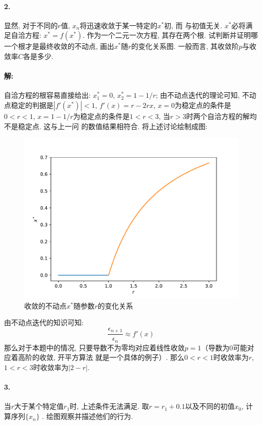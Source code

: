 \documentclass[a4paper,zihao=5,UTF8]{ctexart}
\begin{document}
    \paragraph{2.}显然, 对于不同的$r$值, $x_n$将迅速收敛于某一特定的$x^*$初, 而
    与初值无关. $x^*$必将满足自洽方程: $x^* = f(x^*)$. 作为一个二元一次方程, 其存在两个根. 
    试判断并证明哪一个根才是最终收敛的不动点, 画出$x^*$随$r$的变化关系图. 
    一般而言, 其收敛阶$p$与收敛率$C$各是多少. 
    \paragraph{解: }
    自洽方程的根容易直接给出: $x^{*}_1 = 0,\,x^*_2 = 1-1/r$; 由不动点迭代的理论可知, 
    不动点稳定的判据是$|f'(x^*)| < 1$, $f'(x) = r - 2rx$, $x=0$为稳定点的条件是$0 < r < 1$, 
    $x = 1 - 1/ r$为稳定点的条件是$1 < r < 3$, 当$r > 3$时两个自洽方程的解均不是稳定点. 这与上一问
    的数值结果相符合. 将上述讨论绘制成图: 
    \begin{figure}[htbp]
        \centering
        \includegraphics[scale=0.5]{2.pdf}
        \caption{收敛的不动点$x^*$随参数$r$的变化关系}
        \label{problem 2}
    \end{figure} 
    由不动点迭代的知识可知:
    \begin{equation}
        \frac{\epsilon_{n+1}}{\epsilon_n}\approx f'(x)
    \end{equation}
    那么对于本题中的情况, 只要导数不为零均对应着线性收敛$p=1$（导数为0可能对应着高阶的收敛, 开平方算法
    就是一个具体的例子）. 那么$0 < r < 1$时收敛率为$r$, $1 < r < 3$时收敛率为$|2 - r|$. 
    
    \paragraph{3.}
    当$r$大于某个特定值$r_1$时, 上述条件无法满足. 取$r = r_1 + 0.1$以及不同的初值$x_0$, 计算序列$\{x_n\}$
    . 绘图观察并描述他们的行为. 
\end{document}
